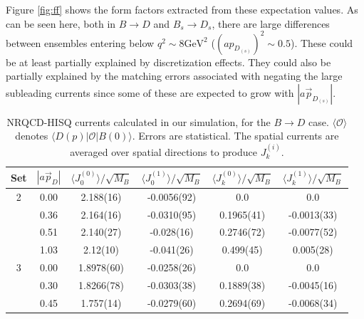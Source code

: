 Figure \ref{fig:ff} shows the form factors extracted from these expectation values. As can be seen here, both in $B\to D$ and $B_s \to D_s$, there are large differences between ensembles entering below $q^2 \sim 8\text{GeV}^2$ ($(ap_{D_{(s)}})^2 \sim 0.5$). These could be at least partially explained by discretization effects. They could also be partially explained by the matching errors associated with negating the large subleading currents since some of these are expected to grow with $\left\vert a\vec{p}_{D_{(s)}} \right\vert$.

\begin{table}
\begin{center}
\begin{tabular}{ c c c c c c }
\hline
Set & $| a\vec{p}_{D} |$ & $\langle J_0^{(0)} \rangle / \sqrt{M_{B}}$& $ \langle J_0^{(1)} \rangle / \sqrt{M_{B}}$& $\langle J_k^{(0)} \rangle / \sqrt{M_{B}}$& $\langle J_k^{(1)} \rangle / \sqrt{M_{B}}$\\ [0.5ex]
\hline
2 & 0.00 & 2.188(16) & -0.0056(92) & 0.0 & 0.0 \\ [0.5ex] 
 & 0.36 & 2.164(16) & -0.0310(95) & 0.1965(41) & -0.0013(33)\\ [0.5ex] 
 & 0.51 & 2.140(27) & -0.028(16) & 0.2746(72) & -0.0077(52)\\ [0.5ex] 
 & 1.03 & 2.12(10) & -0.041(26) & 0.499(45) & 0.005(28)\\ [0.5ex] 
 \hline
3 & 0.00 & 1.8978(60) & -0.0258(26) & 0.0 & 0.0 \\ [0.5ex] 
 & 0.30 & 1.8266(78) & -0.0303(38) & 0.1889(38) & -0.0045(16)\\ [0.5ex] 
 & 0.45 & 1.757(14) & -0.0279(60) & 0.2694(69) & -0.0068(34)\\ [0.5ex] 
\hline
\end{tabular}
\caption{NRQCD-HISQ currents calculated in our simulation, for the $B\to D$ case. $\langle \mathcal{O} \rangle$ denotes $\langle D(p) | \mathcal{O} | B(0) \rangle$. Errors are statistical. The spatial currents are averaged over spatial directions to produce $J_k^{(i)}$. \label{table:fitresults}}
\end{center}
\end{table}

